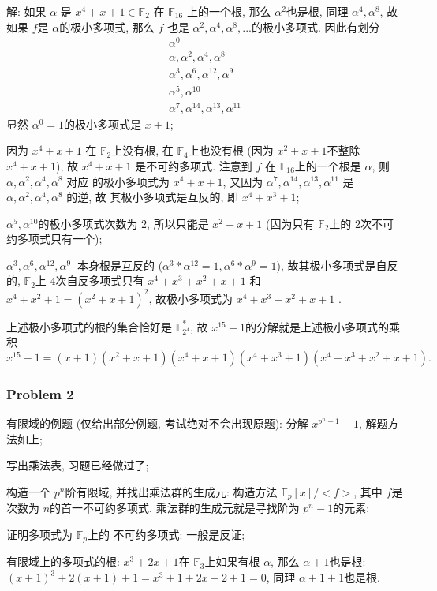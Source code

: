 \documentclass[a4paper,12pt]{ctexart}
\newcommand{\F}{\mathbb{F}}
\begin{document}
    解: 如果 $\alpha$ 是 $x^4+x+1\in \mathbb{F}_2$ 在 $\mathbb{F}_{16}$ 上的一个根, 那么 $ \alpha^2 $也是根, 同理 $ \alpha^4,\alpha^8 $, 故 如果 $ f $是 $ \alpha $的极小多项式, 那么 $ f $ 也是 $ \alpha^2,\alpha^4,\alpha^8,... $的极小多项式. 因此有划分
    \begin{align*}
      \alpha^0\\
      \alpha,\alpha^2,\alpha^4,\alpha^8\\
      \alpha^3,\alpha^6,\alpha^{12},\alpha^9\\
      \alpha^5,\alpha^{10}\\
      \alpha^7,\alpha^{14},\alpha^{13},\alpha^{11}
    \end{align*}
      显然 $ \alpha^0=1 $的极小多项式是 $ x+1 $;

      因为 $ x^4+x+1 $ 在 $ \F_2 $上没有根, 在 $ \F_4 $上也没有根 (因为 $ x^2+x+1 $不整除 $ x^4+x+1 $), 故 $ x^4+x+1 $ 是不可约多项式. 注意到 $ f $ 在 $ \F_{16} $上的一个根是 $ \alpha $, 则 $ \alpha,\alpha^2,\alpha^4,\alpha^8 $ 对应
      的极小多项式为 $ x^4+x+1 $, 又因为 $ \alpha^7,\alpha^{14},\alpha^{13},\alpha^{11} $ 是$ \alpha,\alpha^2,\alpha^4,\alpha^8 $ 的逆, 故 其极小多项式是互反的, 即 $ x^4+x^3+1 $; 
      
      $ \alpha^5,\alpha^{10} $的极小多项式次数为 $ 2 $, 所以只能是 $ x^2+x+1 $ (因为只有 $ \F_2 $上的 $ 2 $次不可约多项式只有一个);

      $ \alpha^3,\alpha^6,\alpha^{12},\alpha^9\ $ 本身根是互反的 ($ \alpha^3*\alpha^{12}=1,\alpha^6*\alpha^9=1 $), 故其极小多项式是自反的, $ \F_2 $上 $ 4 $次自反多项式只有 $ x^4+x^3+x^2+x+1 $ 和 $ x^4+x^2+1=(x^2+x+1)^2 $, 故极小多项式为 $ x^4+x^3+x^2+x+1 $ .

      上述极小多项式的根的集合恰好是 $ \F_{2^4}^* $, 故 $ x^{15}-1 $的分解就是上述极小多项式的乘积
      \[x^{15}-1=(x+1)(x^2+x+1)(x^4+x+1)(x^4+x^3+1)(x^4+x^3+x^2+x+1).\]

      \subsubsection*{Problem 2}
      有限域的例题 (仅给出部分例题, 考试绝对不会出现原题):
      分解 $ x^{p^n-1}-1 $, 解题方法如上;

      写出乘法表, 习题已经做过了;

      构造一个 $ p^n $阶有限域, 并找出乘法群的生成元: 构造方法 $ \F_p[x]/<f> $, 其中 $ f $是次数为 $ n $的首一不可约多项式, 乘法群的生成元就是寻找阶为 $ p^n-1 $的元素;

      证明多项式为 $ \F_p $上的 不可约多项式: 一般是反证;

      有限域上的多项式的根: $ x^3+2x+1 $在 $ \F_3 $上如果有根 $ \alpha $, 那么 $ \alpha+1 $也是根: $ (x+1)^3+2(x+1)+1=x^3+1+2x+2+1=0 $, 同理 $ \alpha+1+1 $也是根.
\end{document}
